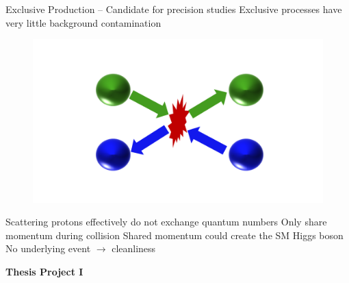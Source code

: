 \documentclass[10pt]{beamer}
\begin{document}
\begin{frame}{Exclusive Production -- Candidate for precision studies}
\centering
{\large\color{blue} Exclusive processes have very little background contamination}
\vspace*{-0.5\baselineskip}
\begin{figure}
\centering
\includegraphics[width=0.6\linewidth]{figures/diffraction.pdf}
\end{figure}
\vspace*{-0.5\baselineskip}
\begin{outline}
\1 Scattering protons effectively do not exchange quantum numbers
\1 Only share momentum during collision
	\2 Shared momentum could create the SM Higgs boson
\1 No underlying event $\rightarrow$ cleanliness 
\end{outline}

\centering
{\bf\large \color{blue} Thesis Project I}\\

\end{frame}
\end{document}
